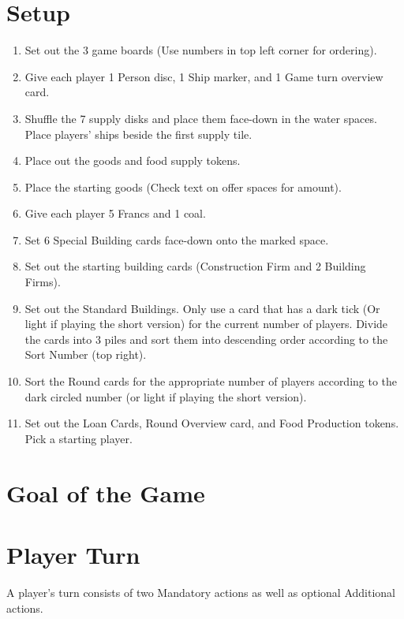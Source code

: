 \documentclass[12pt]{article}
\newenvironment{enumerateCustom}
{\begin{enumerate}
  \setlength{\itemsep}{1pt}
  \setlength{\parskip}{0pt}
  \setlength{\parsep}{0pt}}
{\end{enumerate}}
\begin{document}
\begin{mdframed}[style = customFrame]
\begin{multicols*}{2}

\section*{Setup}
\begin{enumerateCustom}
	\item Set out the 3 game boards (Use numbers in top left corner for ordering).
	\item Give each player 1 Person disc, 1 Ship marker, and 1 Game turn overview card.
	\item Shuffle the 7 supply disks and place them face-down in the water spaces. Place players' ships beside the first supply tile.
	\item Place out the goods and food supply tokens.
	\item Place the starting goods (Check text on offer spaces for amount).
	\item Give each player 5 Francs and 1 coal.
	\item Set 6 Special Building cards face-down onto the marked space.
	\item Set out the starting building cards (Construction Firm and 2 Building Firms).
	\item Set out the Standard Buildings. Only use a card that has a dark tick (Or light if playing the short version) for the current number of players. Divide the cards into 3 piles and sort them into descending order according to the Sort Number (top right).
	\item Sort the Round cards for the appropriate number of players according to the dark circled number (or light if playing the short version).
	\item Set out the Loan Cards, Round Overview card, and Food Production tokens. Pick a starting player.
\end{enumerateCustom}

\section*{Goal of the Game}

\section*{Player Turn}
A player's turn consists of two Mandatory actions as well as optional Additional actions. 


\end{multicols*}
\end{mdframed}
\end{document}
